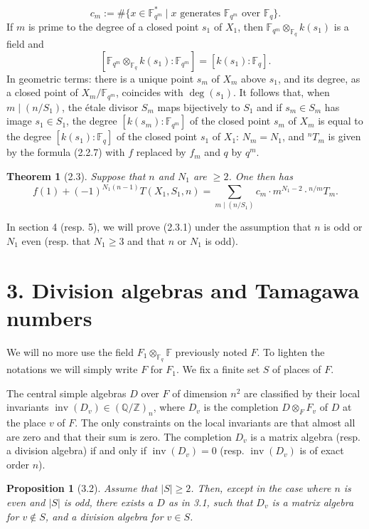 \documentclass[10pt]{article}
\newcommand{\Fq}{\mathbb F_q}
\newcommand{\Fqm}{\mathbb F_{q^m}}
\newcommand{\Fb}{\mathbb F}
\newcommand{\Z}{\mathbb Z}
\newcommand{\Q}{\mathbb Q}
\newcommand{\degm}{\operatorname{deg}}
\newcommand{\inv}{\operatorname{inv}}
\theoremstyle{deligne}
\newtheorem*{theorem*}{Theorem}
\newtheorem*{proposition*}{Proposition}
\newcommand{\heading}[1]{\vspace{0.7em}\noindent{\bfseries #1}\quad}
\begin{document}
\begin{equation}\tag{2.2.9}
c_m:=\#\{x\in\Fqm^*\mid x\text{ generates }\Fqm\text{ over }\Fq\}.
\end{equation}
If $m$ is prime to the degree of a closed point $s_1$ of $X_1$, then $\Fqm\otimes_{\Fq}k(s_1)$ is a field and
\[
[\Fqm\otimes_{\Fq}k(s_1):\Fqm]=[k(s_1):\Fq].
\]
In geometric terms: there is a unique point $s_m$ of $X_m$ above $s_1$, and its degree, as a closed point of $X_m/\Fqm$, coincides with $\degm(s_1)$. It follows that, when $m\mid(n/S_1)$, the \'{e}tale divisor $S_m$ maps bijectively to $S_1$ and if $s_m\in S_m$ has image $s_1\in S_1$, the degree $[k(s_m):\Fqm]$ of the closed point $s_m$ of $X_m$ is equal to the degree $[k(s_1):\Fq]$ of the closed point $s_1$ of $X_1$: $N_m=N_1$, and ${}^nT_m$ is given by the formula (2.2.7) with $f$ replaced by $f_m$ and $q$ by $q^m$.

\begin{theorem*}[2.3]
Suppose that $n$ and $N_1$ are $\ge2$. One then has
\begin{equation}\tag{2.3.1}
f(1)+(-1)^{N_1(n-1)}T(X_1,S_1,n)
=\sum_{m\mid(n/S_1)} c_m\cdot m^{N_1-2}\cdot{}^{n/m}T_m.
\end{equation}
\end{theorem*}
In section 4 (resp. 5), we will prove (2.3.1) under the assumption that $n$ is odd or $N_1$ even (resp. that $N_1\ge3$ and that $n$ or $N_1$ is odd).

\section*{3. Division algebras and Tamagawa numbers}

We will no more use the field $F_1\otimes_{\Fq}\Fb$ previously noted $F$. To lighten the notations we will simply write $F$ for $F_1$. We fix a finite set $S$ of places of $F$.

\heading{3.1.} The central simple algebras $D$ over $F$ of dimension $n^2$ are classified by their local invariants $\inv(D_v)\in(\Q/\Z)_n$, where $D_v$ is the completion $D\otimes_FF_v$ of $D$ at the place $v$ of $F$. The only constraints on the local invariants are that almost all are zero and that their sum is zero. The completion $D_v$ is a matrix algebra (resp. a division algebra) if and only if $\inv(D_v)=0$ (resp. $\inv(D_v)$ is of exact order $n$).

\begin{proposition*}[3.2]
Assume that $|S|\ge2$. Then, except in the case where $n$ is even and $|S|$ is odd, there exists a $D$ as in 3.1, such that $D_v$ is a matrix algebra for $v\notin S$, and a division algebra for $v\in S$.
\end{proposition*}
\end{document}
